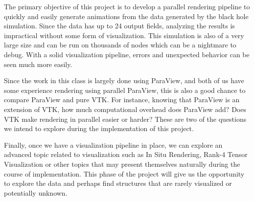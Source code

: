 The primary objective of this project is to develop a parallel rendering pipeline to quickly and easily generate animations from the data generated by the black hole simulation. Since the data has up to 24 output fields, analyzing the results is impractical without some form of visualization. This simulation is also of a very large size and can be run on thousands of nodes which can be a nightmare to debug. With a solid visualization pipeline, errors and unexpected behavior can be seen much more easily.

Since the work in this class is largely done using ParaView, and both of us have some experience rendering using parallel ParaView, this is also a good chance to compare ParaView and pure VTK. For instance, knowing that ParaView is an extension of VTK, how much computational overhead does ParaView add? Does VTK make rendering in parallel easier or harder? These are two of the questions we intend to explore during the implementation of this project.

Finally, once we have a visualization pipeline in place, we can explore an advanced topic related to visualization such as In Situ Rendering, Rank-4 Tensor Visualization or other topics that may present themselves naturally during the course of implementation. This phase of the project will give us the opportunity to explore the data and perhaps find structures that are rarely visualized or potentially unknown.